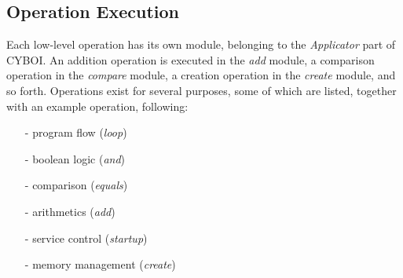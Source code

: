 %
%
%
%
%
%
%

\subsection{Operation Execution}
\label{operation_execution_heading}

Each low-level operation has its own module, belonging to the \emph{Applicator}
part of CYBOI. An addition operation is executed in the \emph{add} module, a
comparison operation in the \emph{compare} module, a creation operation in the
\emph{create} module, and so forth. Operations exist for several purposes, some
of which are listed, together with an example operation, following:

\begin{itemize}
    \item[-] program flow (\emph{loop})
    \item[-] boolean logic (\emph{and})
    \item[-] comparison (\emph{equals})
    \item[-] arithmetics (\emph{add})
    \item[-] service control (\emph{startup})
    \item[-] memory management (\emph{create})
\end{itemize}

